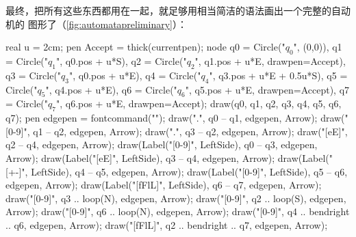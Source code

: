 最终，把所有这些东西都用在一起，就足够用相当简洁的语法画出一个完整的自动机的
图形了（\autoref{fig:automatapreliminary}）：
\begin{asycode}
real u = 2cm;
pen Accept = thick(currentpen);
node q0 = Circle("$q_0$", (0,0)),
     q1 = Circle("$q_1$", q0.pos + u*S),
     q2 = Circle("$q_2$", q1.pos + u*E, drawpen=Accept),
     q3 = Circle("$q_3$", q0.pos + u*E),
     q4 = Circle("$q_4$", q3.pos + u*E + 0.5u*S),
     q5 = Circle("$q_5$", q4.pos + u*E),
     q6 = Circle("$q_6$", q5.pos + u*E, drawpen=Accept),
     q7 = Circle("$q_7$", q6.pos + u*E, drawpen=Accept);
draw(q0, q1, q2, q3, q4, q5, q6, q7);
pen edgepen = fontcommand("\scriptsize\ttfamily");
draw(".",     q0 -- q1, edgepen, Arrow);
draw("[0-9]", q1 -- q2, edgepen, Arrow);
draw(".",     q3 -- q2, edgepen, Arrow);
draw("[eE]",  q2 -- q4, edgepen, Arrow);
draw(Label("[0-9]", LeftSide),  q0 -- q3, edgepen, Arrow);
draw(Label("[eE]", LeftSide),   q3 -- q4, edgepen, Arrow);
draw(Label("[+-]", LeftSide),   q4 -- q5, edgepen, Arrow);
draw(Label("[0-9]", LeftSide),  q5 -- q6, edgepen, Arrow);
draw(Label("[fFlL]", LeftSide), q6 -- q7, edgepen, Arrow);
draw("[0-9]", q3 .. loop(N), edgepen, Arrow);
draw("[0-9]", q2 .. loop(S), edgepen, Arrow);
draw("[0-9]", q6 .. loop(N), edgepen, Arrow);
draw("[0-9]",  q4 .. bendright .. q6, edgepen, Arrow);
draw("[fFlL]", q2 .. bendright .. q7, edgepen, Arrow);
\end{asycode}
